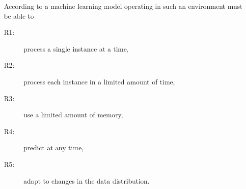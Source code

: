\documentclass[letterpaper]{article} %
\begin{document}
According to \citet{bifetMOAMassiveOnline2010} a machine learning model operating in such an environment must be able to
\begin{center}
	\begin{varwidth}{0.5\textwidth}
		\begin{description}
			\item[R1:] process a single instance at a time,\label{rq:single_instance}
			\item[R2:] process each instance in a limited amount of time,\label{rq:limited_time}
			\item[R3:] use a limited amount of memory,\label{rq:limited_memory}
			\item[R4:] predict at any time,\label{rq:predict_any_time}
			\item[R5:] adapt to changes in the data distribution.\label{rq:adapt_to_drift}
		\end{description}
	\end{varwidth}
\end{center}
\end{document}
